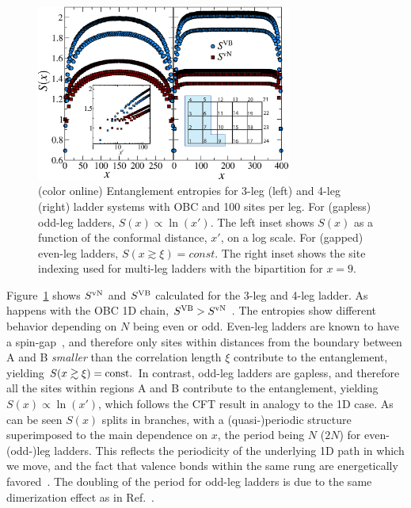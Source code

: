 \documentclass[prl,aps,twocolumn,floatfix,amsmath,amssymb,superscriptaddress,tightenlines]{revtex4}
\begin{document}
\begin{figure} { \includegraphics[width=3.3in]{FIG23NEW.eps}
\caption{(color online) Entanglement entropies for 3-leg (left)
and 4-leg (right) ladder systems with OBC and 100 sites per leg.  For
(gapless) odd-leg ladders, $S(x)\propto\ln(x')$.  The left
inset shows $S(x)$ as a function of the conformal distance, $x'$, on a log
scale. For (gapped) even-leg ladders, $S(x\gtrsim\xi)=const.$
The right inset shows the site indexing used for multi-leg ladders with the
bipartition for $x=9$.  \label{ladder} }} \end{figure}

Figure~\ref{ladder} shows $S^{ \rm vN}$ and $S^{\rm VB}$ calculated
for the 3-leg and 4-leg ladder. As happens with the OBC 1D chain, $S^{\rm VB} > S^{ \rm vN}$ .  
The entropies show different behavior depending on
$N$ being even or odd.  Even-leg ladders are known to have a
spin-gap~\cite{White1994}, and therefore only sites within distances from
the boundary between A and B {\it smaller} than the correlation length
$\xi$ contribute to the entanglement, yielding $S(x\gtrsim \xi)= {\rm
const}.$ In contrast, odd-leg ladders are gapless, and therefore all the
sites within regions A and B contribute to the entanglement, 
yielding $S(x)\propto\ln(x')$, 
which follows the CFT result in
analogy to the 1D case. As can be seen $S(x)$ splits in branches, with a
(quasi-)periodic structure superimposed to the main dependence on $x$,
the period being $N$ ($2N$) for even- (odd-)leg ladders. This reflects the
periodicity of the underlying 1D path in which we move, and the fact that
valence bonds within the same rung are energetically
favored~\cite{White1994}. The doubling of the period for odd-leg ladders
is due to the same dimerization effect as in Ref.~\cite{Ian1}.
\end{document}
